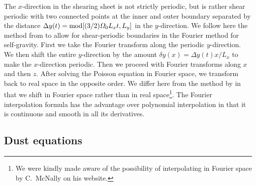 \documentclass[\mydriver,12pt,twoside,notitlepage,a4paper]{article}
\begin{document}
The $x$-direction in the shearing sheet is not strictly periodic, but is rather
shear periodic with two connected points at the inner and outer boundary
separated by the distance $\Delta y(t)={\rm mod}[(3/2) \varOmega_0 L_x t,L_y]$
in the $y$-direction. We follow here the method from \cite{Gammie2001} to allow
for shear-periodic boundaries in the Fourier method for self-gravity. First we
take the Fourier transform along the periodic $y$-direction. We then shift
the entire $y$-direction by the amount $\delta y(x)=\Delta y(t) x/L_x$ to make
the $x$-direction periodic. Then we proceed with Fourier transforms along $x$
and then $z$. After solving the Poisson equation in Fourier space, we transform
back to real space in the opposite order. We differ here from the method by
\cite{Gammie2001} in that we shift in Fourier space rather than in real
space\footnote{We were kindly made aware of the possibility of interpolating in
Fourier space by C.\ McNally on his website.}. The Fourier interpolation formula
has the advantage over polynomial interpolation in that it is continuous and
smooth in all its derivatives.


\subsection{Dust equations}
\end{document}
